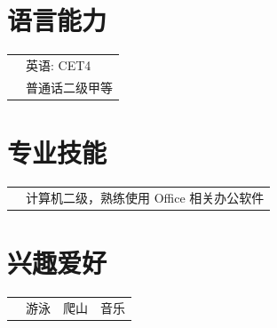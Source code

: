\documentclass[a4paper,11pt]{article}
\begin{document}
\section{语言能力}
\begin{tabular}{rl}
&英语: CET4\\
&普通话二级甲等\\
\end{tabular}

\section{专业技能}
\begin{tabular}{rl}
&计算机二级，熟练使用 Office 相关办公软件\\
\end{tabular}

\section{兴趣爱好}
\begin{tabular}{rl}
&游泳~~爬山~~音乐
\end{tabular}
\end{document}
